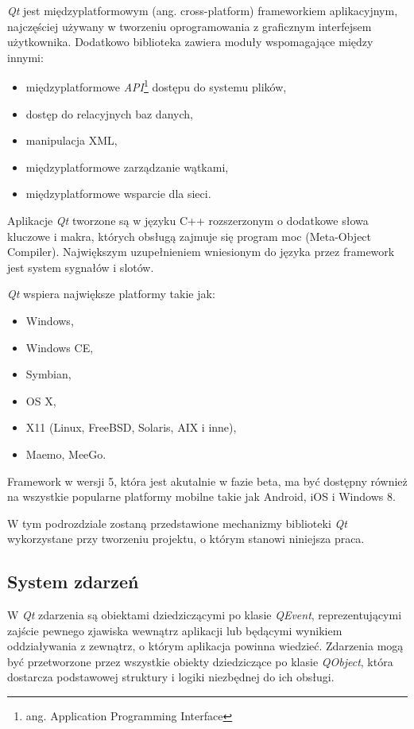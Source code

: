 \emph{Qt} jest międzyplatformowym (ang. cross-platform) frameworkiem aplikacyjnym, najczęściej używany w tworzeniu oprogramowania z graficznym interfejsem użytkownika.
Dodatkowo biblioteka zawiera moduły wspomagające między innymi:
\begin{itemize}
\item międzyplatformowe \emph{API}\footnote{ang. Application Programming Interface} dostępu do systemu plików,
\item dostęp do relacyjnych baz danych,
\item manipulacja XML,
\item międzyplatformowe zarządzanie wątkami,
\item międzyplatformowe wsparcie dla sieci.
\end{itemize}

Aplikacje \emph{Qt} tworzone są w języku C++ rozszerzonym o dodatkowe słowa kluczowe i makra, których obsługą zajmuje się program moc (Meta-Object Compiler). Największym uzupełnieniem wniesionym do języka przez framework jest system sygnałów i slotów.

\emph{Qt} wspiera największe platformy takie jak:
\begin{itemize}
\item Windows,
\item Windows CE,
\item Symbian,
\item OS X,
\item X11 (Linux, FreeBSD, Solaris, AIX i inne),
\item Maemo, MeeGo.
\end{itemize}

Framework w wersji 5, która jest akutalnie w fazie beta, ma być dostępny również na wszystkie popularne platformy mobilne takie jak Android, iOS i Windows 8.

W tym podrozdziale zostaną przedstawione mechanizmy biblioteki \emph{Qt} wykorzystane przy tworzeniu projektu, o którym stanowi niniejsza praca. 

\subsection{System zdarzeń}
W \emph{Qt} zdarzenia są obiektami dziedziczącymi po klasie \emph{QEvent}, reprezentującymi zajście pewnego zjawiska wewnątrz aplikacji lub będącymi wynikiem oddziaływania z zewnątrz, o którym aplikacja powinna wiedzieć. Zdarzenia mogą być przetworzone przez wszystkie obiekty dziedziczące po klasie \emph{QObject}, która dostarcza podstawowej struktury i logiki niezbędnej do ich obsługi. 

